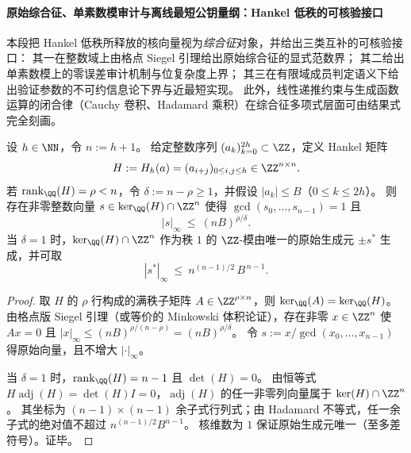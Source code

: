\paragraph{原始综合征、单素数模审计与离线最短公钥量纲：Hankel 低秩的可核验接口}\label{par:xi-hankel-syndrome-offline-audit-optimality}
本段把 Hankel 低秩所释放的核向量视为\emph{综合征}对象，并给出三类互补的可核验接口：
其一在整数域上由格点 Siegel 引理给出原始综合征的显式范数界；
其二给出单素数模上的零误差审计机制与位复杂度上界；
其三在有限域成员判定语义下给出验证参数的不可约信息论下界与近最短实现。
此外，线性递推约束与生成函数运算的闭合律（Cauchy 卷积、Hadamard 乘积）在综合征多项式层面可由结果式完全刻画。

\begin{theorem}\label{thm:xi-hankel-primitive-syndrome-siegel-bound}
设 \(h\in\NN\)，令 \(n:=h+1\)。
给定整数序列 \((a_k)_{k=0}^{2h}\subset\ZZ\)，定义 Hankel 矩阵
\[
H:=H_h(a)=(a_{i+j})_{0\le i,j\le h}\in\ZZ^{n\times n}.
\]
若 \(\mathrm{rank}_{\QQ}(H)=\rho<n\)，令 \(\delta:=n-\rho\ge 1\)，并假设 \(|a_k|\le B\)（\(0\le k\le 2h\)）。
则存在非零整数向量 \(s\in\ker_{\QQ}(H)\cap\ZZ^n\) 使得 \(\gcd(s_0,\dots,s_{n-1})=1\) 且
\[
|s|_\infty\ \le\ (nB)^{\rho/\delta}.
\]
当 \(\delta=1\) 时，\(\ker_{\QQ}(H)\cap\ZZ^n\) 作为秩 \(1\) 的 \(\ZZ\)-模由唯一的原始生成元 \(\pm s^\ast\) 生成，并可取
\[
|s^\ast|_\infty\ \le\ n^{(n-1)/2}\,B^{\,n-1}.
\]
\end{theorem}
\begin{proof}
取 \(H\) 的 \(\rho\) 行构成的满秩子矩阵 \(A\in\ZZ^{\rho\times n}\)，则 \(\ker_{\QQ}(A)=\ker_{\QQ}(H)\)。
由格点版 Siegel 引理（或等价的 Minkowski 体积论证），存在非零 \(x\in\ZZ^n\) 使 \(Ax=0\) 且
\(
|x|_\infty\le (nB)^{\rho/(n-\rho)}=(nB)^{\rho/\delta}
\)。
令 \(s:=x/\gcd(x_0,\dots,x_{n-1})\) 得原始向量，且不增大 \(|\cdot|_\infty\)。
\par
当 \(\delta=1\) 时，\(\mathrm{rank}_{\QQ}(H)=n-1\) 且 \(\det(H)=0\)。
由恒等式 \(H\operatorname{adj}(H)=\det(H)I=0\)，\(\operatorname{adj}(H)\) 的任一非零列向量属于 \(\ker(H)\cap\ZZ^n\)。
其坐标为 \((n-1)\times(n-1)\) 余子式行列式；由 Hadamard 不等式，任一余子式的绝对值不超过
\(
n^{(n-1)/2}B^{n-1}
\)。
核维数为 \(1\) 保证原始生成元唯一（至多差符号）。证毕。
\end{proof}

